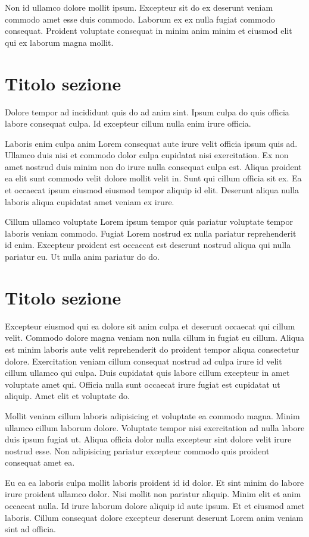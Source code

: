 Non id ullamco dolore mollit ipsum. Excepteur sit do ex deserunt veniam commodo amet esse duis commodo. Laborum ex ex nulla fugiat commodo consequat. Proident voluptate consequat in minim anim minim et eiusmod elit qui ex laborum magna mollit.

\section{Titolo sezione}

Dolore tempor ad incididunt quis do ad anim sint. Ipsum culpa do quis officia labore consequat culpa. Id excepteur cillum nulla enim irure officia.

Laboris enim culpa anim Lorem consequat aute irure velit officia ipsum quis ad. Ullamco duis nisi et commodo dolor culpa cupidatat nisi exercitation. Ex non amet nostrud duis minim non do irure nulla consequat culpa est. Aliqua proident ea elit sunt commodo velit dolore mollit velit in. Sunt qui cillum officia sit ex. Ea et occaecat ipsum eiusmod eiusmod tempor aliquip id elit. Deserunt aliqua nulla laboris aliqua cupidatat amet veniam ex irure.

Cillum ullamco voluptate Lorem ipsum tempor quis pariatur voluptate tempor laboris veniam commodo. Fugiat Lorem nostrud ex nulla pariatur reprehenderit id enim. Excepteur proident est occaecat est deserunt nostrud aliqua qui nulla pariatur eu. Ut nulla anim pariatur do do.

\section{Titolo sezione}

Excepteur eiusmod qui ea dolore sit anim culpa et deserunt occaecat qui cillum velit. Commodo dolore magna veniam non nulla cillum in fugiat eu cillum. Aliqua est minim laboris aute velit reprehenderit do proident tempor aliqua consectetur dolore. Exercitation veniam cillum consequat nostrud ad culpa irure id velit cillum ullamco qui culpa. Duis cupidatat quis labore cillum excepteur in amet voluptate amet qui. Officia nulla sunt occaecat irure fugiat est cupidatat ut aliquip. Amet elit et voluptate do.

Mollit veniam cillum laboris adipisicing et voluptate ea commodo magna. Minim ullamco cillum laborum dolore. Voluptate tempor nisi exercitation ad nulla labore duis ipsum fugiat ut. Aliqua officia dolor nulla excepteur sint dolore velit irure nostrud esse. Non adipisicing pariatur excepteur commodo quis proident consequat amet ea.

Eu ea ea laboris culpa mollit laboris proident id id dolor. Et sint minim do labore irure proident ullamco dolor. Nisi mollit non pariatur aliquip. Minim elit et anim occaecat nulla. Id irure laborum dolore aliquip id aute ipsum. Et et eiusmod amet laboris. Cillum consequat dolore excepteur deserunt deserunt Lorem anim veniam sint ad officia.
